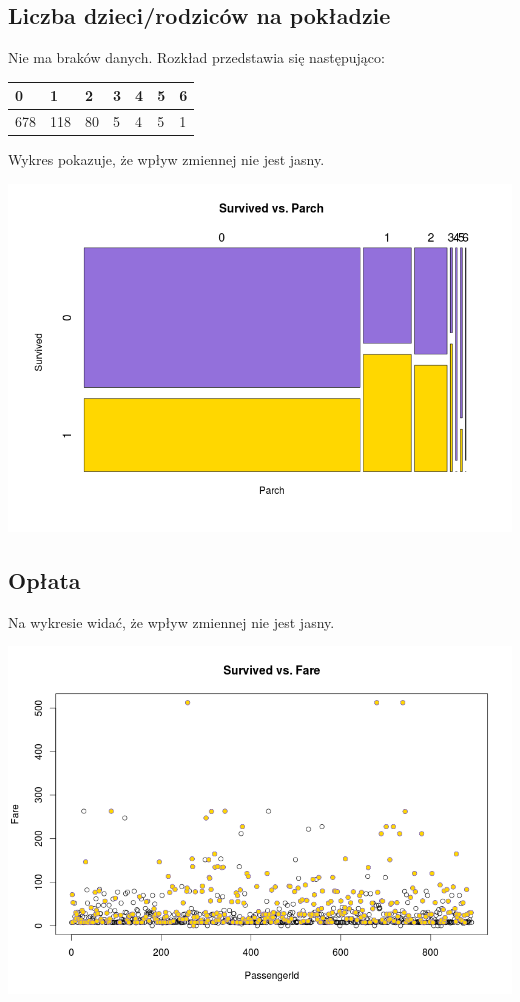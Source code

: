 \documentclass{article}
\begin{document}
\subsection{Liczba dzieci/rodziców na pokładzie}

Nie ma braków danych. Rozkład przedstawia się następująco:
\begin{center}
    \begin{tabular}{| l | l | l | l | l | l | l |}
    \hline
 0  & 1  & 2 &  3  & 4 &  5  & 6 \\ \hline
 678 & 118 & 80 &  5  & 4  & 5 &  1 \\
    \hline
    \end{tabular}
\end{center}

Wykres pokazuje, że wpływ zmiennej nie jest jasny.
\begin{center}
\includegraphics[scale=0.40]{images/survived-vs-parch.png}
\end{center}

\subsection{Opłata}

Na wykresie widać, że wpływ zmiennej nie jest jasny.
\begin{center}
\includegraphics[scale=0.40]{images/survived-vs-fare.png}
\end{center}
\end{document}
